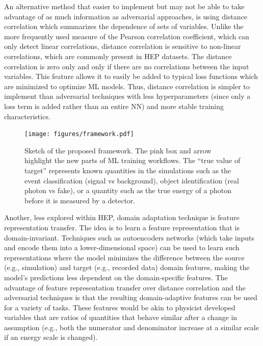 \documentclass[letter, USenglish, 11pt, subfigure]{article}
\begin{document}
An alternative method that easier to implement but may not be able to take advantage of as much information as adversarial approaches, is using distance correlation which summarizes the dependence of sets of variables. Unlike the more frequently used measure of the Pearson correlation coefficient, which can only detect linear correlations, distance correlation is sensitive to non-linear correlations, which are commonly present in HEP datasets. The distance correlation is zero only and only if there are no correlations between the input variables. This feature allows it to easily be added to typical loss functions which are minimized to optimize ML models. Thus, distance correlation is simpler to implement than adversarial techniques with less hyperparameters (since only a loss term is added rather than an entire NN) and more stable training characteristics. 
\begin{figure}
  \centering
  \texttt{[image: figures/framework.pdf]}
  \caption{\label{fig:framework} Sketch of the proposed framework. The pink box and arrow highlight the new parts of ML training workflows. The ``true value of target'' represents known quantities in the simulations such as the event classification (signal vs background), object identification (real photon vs fake), or a quantity such as the true energy of a photon before it is measured by a detector. }
\end{figure}
Another, less explored within HEP, domain adaptation technique is feature representation transfer. The idea is to learn a feature representation that is domain-invariant. Techniques such as autoencoders networks (which take inputs and encode them into a lower-dimensional space) can be used to learn such representations where the model minimizes the difference between the source (e.g., simulation) and target (e.g., recorded data) domain features, making the model's predictions less dependent on the domain-specific features. The advantage of feature representation transfer over distance correlation and the adversarial techniques is that the resulting domain-adaptive features can be used for a variety of tasks. These features would be akin to physicist developed variables that are ratios of quantities that behave similar after a change in assumption (e.g., both the numerator and denominator increase at a similar scale if an energy scale is changed).
\end{document}
